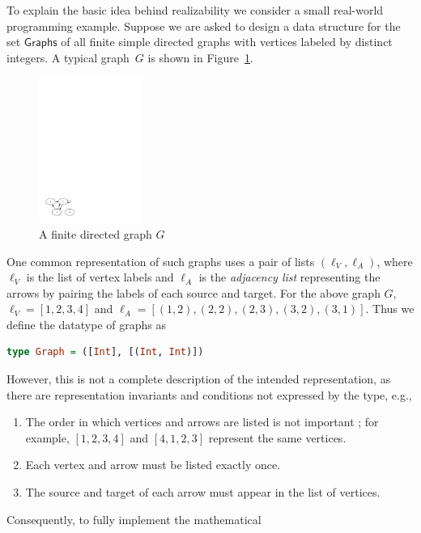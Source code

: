 To explain the basic idea behind realizability we consider a small
real-world programming example. Suppose we are asked to design a data
structure for the set $\mathsf{Graphs}$ of all finite
simple directed graphs with vertices labeled by distinct
integers. A typical graph~$G$ is shown in Figure~\ref{fig:digraph}.
%
\begin{figure}[htp]
  \centering
  \includegraphics[width=0.3\textwidth]{digraph}
  \caption{A finite directed graph $G$}
  \label{fig:digraph}
\end{figure}
%
One common representation of such graphs uses a pair of lists
$(\ell_V, \ell_A)$, where $\ell_V$ is the list of vertex labels and
$\ell_A$ is the \emph{adjacency list} representing the arrows by
pairing the labels of each source and target. For the above graph $G$,
$\ell_V = [1, 2, 3, 4]$ and $\ell_A = [(1,2), (2,2), (2,3), (3,2),
(3,1)]$.
%
Thus we define the datatype of graphs as
%
\begin{lstlisting}[language=Haskell]
type Graph = ([Int], [(Int, Int)])
\end{lstlisting}
%
However, this is not a complete description of the intended
representation, as there are representation invariants and conditions
not expressed by the type, e.g.,
%
\begin{enumerate}
\item The order in which vertices and arrows are listed is not
  important%
; for example, $[1,2,3,4]$ and $[4,1,2,3]$ represent the same vertices.
\item Each vertex and arrow must be listed exactly once.
\item The source and target of each arrow must appear in the list of vertices.
\end{enumerate}
%
Consequently, to fully implement the mathematical
